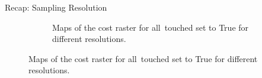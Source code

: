 \documentclass[usenames,dvipsnames,aspectratio=169]{beamer}
\begin{document}
	\begin{frame}{Recap: Sampling Resolution}
		\begin{figure}
		\begin{figure}
			\centering
			\enskip
			\enskip
			
			\caption{Maps of the cost raster for all~touched set to True for different resolutions.}
			\label{fig:CostAllTouchedTrue}
		\end{figure}
		\end{figure}
	\end{frame}

	
	
\end{document}
